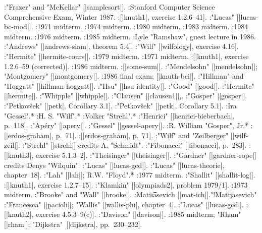 :"Frazer" and "McKellar" [|samplesort|].
:Stanford Computer Science Compre\-hensive Exam, Winter 1987.
:[|knuth1|, exercise 1.2.6--41].
:"Lucas" [|lucas-bc-mod|].
:1971 midterm.
:1974 midterm.
:1980 midterm.
:1983 midterm.
:1984 midterm.
:1976 midterm.
:1985 midterm.
:Lyle "Ramshaw", guest lecture in 1986.
:"Andrews" [|andrews-siam|, theorem 5.4].
:"Wilf" [|wilfology|, exercise 4.16].
:"Hermite" [|hermite-cours|].
:1979 midterm.
:1971 midterm.
:[|knuth1|, exercise 1.2.6--59 (corrected)].
:1986 midterm.
:[|some-sum|].
:"Mendelsohn" [|mendelsohn|]; "Montgomery" [|montgomery|].
:1986 final exam; [|knuth-bci|].
:"Hillman" and "Hoggatt" [|hillman-hoggatt|].
:"Hsu" [|hsu-identity|].
:"Good" [|good|].
:"Hermite" [|hermite|].
:"Whipple" [|whipple|].
:"Clausen" [|clausen1|],\thinspace [|clausen2|].
:"Gosper" [|gosper|].
:"Petkov\v {s}ek" [|petk|, Corollary 3.1].
:"Petkov\v {s}ek" [|petk|, Corollary 5.1].
:Ira "Gessel".*
:H. S. "Wilf".*
:Volker "Strehl".*
:"Henrici" [|henrici-bieberbach|, p.~118].
:"Ap\'ery" [|apery|].
:"Gessel" [|gessel-apery|].
:R. William "Gosper", Jr.*
:[|erdos-graham|, p.~71].
:[|erdos-graham|, p.~71].
:"Wilf" and "Zeilberger" [|wilf-zeil|].
:"Strehl" [|strehl|] credits A. "Schmidt".
:"Fibonacci" [|fibonacci|, p.~283].
:[|knuth3|, exercise 5.1.3--2].
:"Theisinger" [|theisinger|].
:"Gardner" [|gardner-rope|] credits Denys "Wilquin".
:"Lucas" [|lucas-gcd|].
:"Lucas" [|lucas-theorie|, chapter~18].
:"Lah" [|lah|]; R.\thinspace W. "Floyd".*
:1977 midterm.
:"Shallit" [|shallit-log|].
:[|knuth1|, exercise 1.2.7--15].
:"Klamkin" [|olympiads2|, problem 1979/1].
:1973 midterm.
:"Brooke" and "Wall" [|brooke|].
:Mati{\t \i }asevich [|mat-ich|]."!Matijasevich"
:"Francesca" [|pacioli|]; "Wallis" [|wallis-phi|, chapter~4].
:"Lucas" [|lucas-gcd|].
:[|knuth2|, exercise 4.5.3--9(c)].
:"Davison" [|davison|].
:1985 midterm; "Rham" [|rham|]; "Dijkstra"~[|dijkstra|, pp.~230--232].
